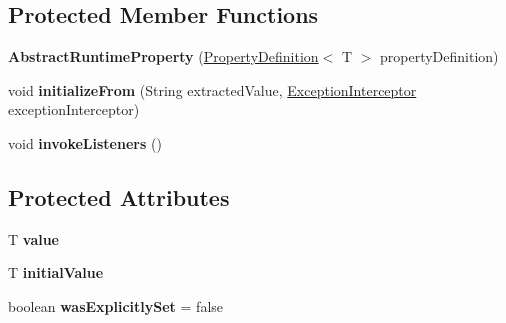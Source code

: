 \subsection*{Protected Member Functions}
\begin{DoxyCompactItemize}
\item 
\mbox{\label{classcom_1_1mysql_1_1cj_1_1conf_1_1_abstract_runtime_property_a434e0683cc5b95d04f26ee6d908fcaf6}} 
{\bfseries Abstract\+Runtime\+Property} (\mbox{\hyperlink{interfacecom_1_1mysql_1_1cj_1_1conf_1_1_property_definition}{Property\+Definition}}$<$ T $>$ property\+Definition)
\item 
\mbox{\label{classcom_1_1mysql_1_1cj_1_1conf_1_1_abstract_runtime_property_a6df5f05e9054868bc4cca590b49f1295}} 
void {\bfseries initialize\+From} (String extracted\+Value, \mbox{\hyperlink{interfacecom_1_1mysql_1_1cj_1_1exceptions_1_1_exception_interceptor}{Exception\+Interceptor}} exception\+Interceptor)
\item 
\mbox{\label{classcom_1_1mysql_1_1cj_1_1conf_1_1_abstract_runtime_property_a52fb1662461037f71b84d92b2286df8f}} 
void {\bfseries invoke\+Listeners} ()
\end{DoxyCompactItemize}
\subsection*{Protected Attributes}
\begin{DoxyCompactItemize}
\item 
\mbox{\label{classcom_1_1mysql_1_1cj_1_1conf_1_1_abstract_runtime_property_ac83f2926daba2525ee721f21254c8d6f}} 
T {\bfseries value}
\item 
\mbox{\label{classcom_1_1mysql_1_1cj_1_1conf_1_1_abstract_runtime_property_a2d12fa3201de2f5dcdc5d46157f5de3e}} 
T {\bfseries initial\+Value}
\item 
\mbox{\label{classcom_1_1mysql_1_1cj_1_1conf_1_1_abstract_runtime_property_a7669f0af6741f751d6b68ffa9b0f9bb5}} 
boolean {\bfseries was\+Explicitly\+Set} = false
\end{DoxyCompactItemize}


